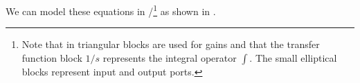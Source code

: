 We can model these equations in \Matlab{}/\Simulink{}\footnote{Note
  that in \Simulink{} triangular blocks are used for gains and that the transfer function
  block $1/s$ represents the integral operator $\int$. The small
  elliptical blocks represent input and output ports.} as shown in .
\begin{slide}\label{slide:l1s1a}
\end{slide}
